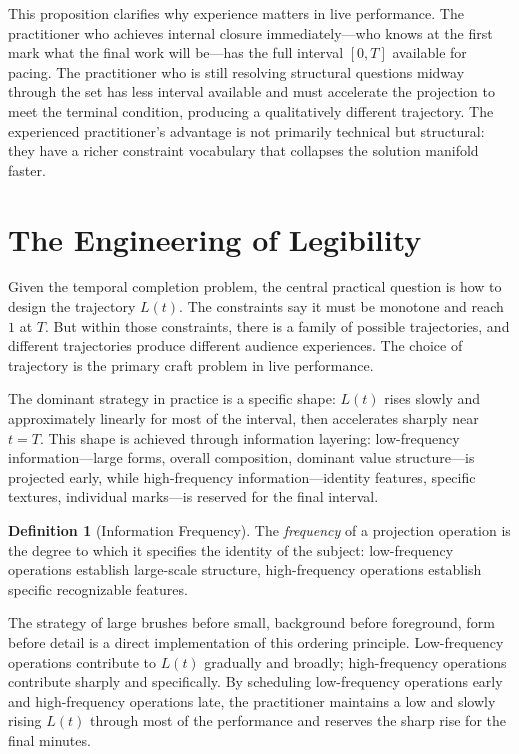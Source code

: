 \documentclass[12pt, twoside]{article}
\theoremstyle{plain}
\theoremstyle{definition}
\newtheorem{definition}[theorem]{Definition}
\theoremstyle{remark}
\begin{document}
This proposition clarifies why experience matters in live performance. The practitioner who achieves internal closure immediately---who knows at the first mark what the final work will be---has the full interval $[0, T]$ available for pacing. The practitioner who is still resolving structural questions midway through the set has less interval available and must accelerate the projection to meet the terminal condition, producing a qualitatively different trajectory. The experienced practitioner's advantage is not primarily technical but structural: they have a richer constraint vocabulary that collapses the solution manifold faster.

\section{The Engineering of Legibility}
\label{sec:legibility}

Given the temporal completion problem, the central practical question is how to design the trajectory $L(t)$. The constraints say it must be monotone and reach $1$ at $T$. But within those constraints, there is a family of possible trajectories, and different trajectories produce different audience experiences. The choice of trajectory is the primary craft problem in live performance.

The dominant strategy in practice is a specific shape: $L(t)$ rises slowly and approximately linearly for most of the interval, then accelerates sharply near $t = T$. This shape is achieved through information layering: low-frequency information---large forms, overall composition, dominant value structure---is projected early, while high-frequency information---identity features, specific textures, individual marks---is reserved for the final interval.

\begin{definition}[Information Frequency]
The \emph{frequency} of a projection operation is the degree to which it specifies the identity of the subject: low-frequency operations establish large-scale structure, high-frequency operations establish specific recognizable features.
\end{definition}

The strategy of large brushes before small, background before foreground, form before detail is a direct implementation of this ordering principle. Low-frequency operations contribute to $L(t)$ gradually and broadly; high-frequency operations contribute sharply and specifically. By scheduling low-frequency operations early and high-frequency operations late, the practitioner maintains a low and slowly rising $L(t)$ through most of the performance and reserves the sharp rise for the final minutes.
\end{document}
